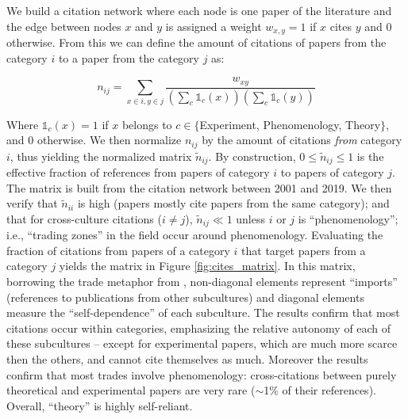 \documentclass[smallextended]{svjour3}
\begin{document}
We build a citation network where each node is one paper of the literature and the edge between nodes $x$ and $y$ is assigned a weight $w_{x,y}=1$ if $x$ cites $y$ and 0 otherwise. From this we can define the amount of citations of papers from the category $i$ to a paper from the category $j$ as: 

\begin{equation}
    \label{eq:cite_matrix}
    n_{ij} = \sum_{x\in i, y\in j} \dfrac{w_{xy}}{(\sum_c \mathds{1}_c(x))(\sum_c \mathds{1}_c(y))} 
\end{equation}

Where $\mathds{1}_c(x)=1$ if $x$ belongs to $c \in \{$Experiment, Phenomenology, Theory$\}$, and 0 otherwise. 
We then normalize $n_{ij}$ by the amount of citations \textit{from} category $i$, thus yielding the normalized matrix $\tilde{n}_{ij}$. By construction, $0\leq \tilde{n}_{ij}\leq 1$ is the effective fraction of references from papers of category $i$ to papers of category $j$. The matrix is built from the citation network between 2001 and 2019. We then verify that $\tilde{n}_{ii}$ is high (papers mostly cite papers from the same category); and that for cross-culture citations ($i\neq j$), $\tilde{n}_{ij} \ll 1$ unless $i$ or $j$ is ``phenomenology''; i.e., ``trading zones'' in the field occur around phenomenology. Evaluating the fraction of citations from papers of a category $i$ that target papers from a category $j$ yields the matrix in Figure \ref{fig:cites_matrix}. In this matrix, borrowing the trade metaphor from \citet{Yan2013}, non-diagonal elements represent ``imports'' (references to publications from other subcultures) and diagonal elements measure the ``self-dependence'' of each subculture. The results confirm that most citations occur within categories, emphasizing the relative autonomy of each of these subcultures -- except for experimental papers, which are much more scarce then the others, and cannot cite themselves as much. Moreover the results confirm that most trades involve phenomenology: cross-citations between purely theoretical and experimental papers are very rare ($\sim$1\% of their references). Overall, ``theory'' is highly self-reliant.
\end{document}
